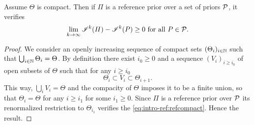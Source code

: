 




\begin{prop}
    Assume $\Theta$ is compact. Then if $\varPi$ is a reference prior over a set of priors $\mathcal{P}$, it verifies
        \begin{equation}\label{eq:intro-ref:refcompact}
            \lim_{k\rightarrow\infty} \mathscr{I}^k(\varPi)-\mathscr{I}^k(P) \geq0\text{\ for all\ } P\in\mathcal{P}.
        \end{equation}
\end{prop}


\begin{proof} 
We consider an openly increasing sequence of compact sets $(\Theta_i)_{i\in\mathbb{N}}$ such that $\bigcup_{i\in\mathbb{N}}\Theta_i = \Theta$.
By definition there exist $i_0\geq0$ and a sequence $(V_i)_{i\geq i_0}$ of open subsets of $\Theta$  such that for any $i\geq i_0$
    \begin{equation}
        \Theta_i\subset V_i\subset \Theta_{i+1}.
    \end{equation}
This way, $\bigcup_iV_i=\Theta$ and the compacity of $\Theta$ imposes it to  be a finite union, so that $\Theta_i=\Theta$ for any $i\geq i_1$ for some $i_1\geq0$.
Since $\varPi$ is a reference prior over $\mathcal{P}$ its renormalized restriction to $\Theta_{i_1}$ verifies the \cref{eq:intro-ref:refcompact}. Hence the result.
\end{proof}


